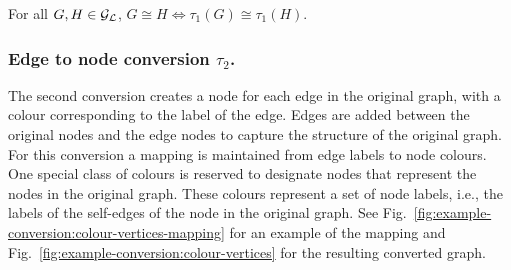 \begin{proposition}
\label{prop:tau-1-injective}
For all $G,H \in \mathcal{G_L}$, $G \cong H \iff \tau_1(G) \cong \tau_1(H)$.
\end{proposition}

\subsubsection{%
\texorpdfstring{Edge to node conversion $\tau_2$.}%
{Label to edge conversion tau 2}}
%
The second conversion creates a node for each edge in the original
graph, with a colour corresponding to the label of the edge. Edges are
added between the original nodes and the edge nodes to capture the structure
of the original graph. For this conversion a mapping is
maintained from edge labels to node colours. One special class of colours is
reserved to designate nodes that represent the nodes in the original graph.
These colours represent a set of node labels, i.e., the labels of the self-edges
of the node in the original graph. See
Fig.~\ref{fig:example-conversion:colour-vertices-mapping} for an example of the
mapping and Fig.~\ref{fig:example-conversion:colour-vertices} for the resulting
converted graph.

